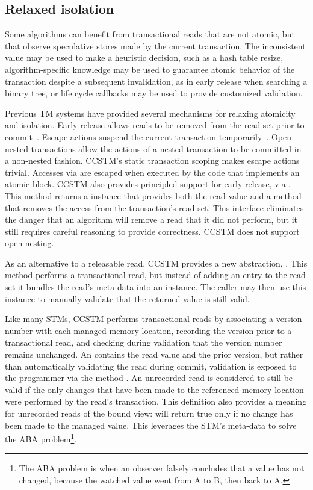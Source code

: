 
\subsection{Relaxed isolation}
\label{sec:unrecordedread}

Some algorithms can benefit from transactional reads that are not atomic,
but that observe speculative stores made by the current transaction.
The inconsistent value may be used to make a heuristic decision, such as a
hash table resize, algorithm-specific knowledge may be used to guarantee
atomic behavior of the transaction despite a subsequent invalidation,
as in early release when searching a binary tree, or life cycle callbacks
may be used to provide customized validation.

Previous TM systems have provided several mechanisms for relaxing
atomicity and isolation.  Early release allows reads to be removed
from the read set prior to commit~\cite{HerlihyLMS03}.  Escape actions
suspend the current transaction temporarily~\cite{harris04exceptions}.
Open nested transactions allow the actions of a nested transaction
to be committed in a non-nested fashion.  CCSTM's static transaction
scoping makes escape actions trivial.  Accesses via 
are escaped when executed by the code that implements an atomic
block. CCSTM also provides principled support for early release,
via .  This method returns a
 instance that provides both the read value and
a method that removes the access from the transaction's read set.
This interface eliminates the danger that an algorithm will remove a
read that it did not perform, but it still requires careful reasoning
to provide correctness.  CCSTM does not support open nesting.

As an alternative to a releasable read, CCSTM provides a new
abstraction, .  This method performs a
transactional read, but instead of adding an entry to the read set it
bundles the read's meta-data into an  instance.
The caller may then use this instance to manually validate that the
returned value is still valid.

Like many STMs, CCSTM performs transactional reads by associating a
version number with each managed memory location, recording the version
prior to a transactional read, and checking during validation that the
version number remains unchanged.  An  contains the
read value and the prior version, but rather than automatically validating
the read during commit, validation is exposed to the programmer via the
method .  An unrecorded read is considered to still be
valid if the only changes that have been made to the referenced memory
location were performed by the read's transaction.  This definition also
provides a meaning for unrecorded reads of the  bound view:
 will return true only if no change has been made to the
managed value.  This leverages the STM's meta-data to solve
the ABA problem\footnote{The ABA problem is when an observer falsely
concludes that a value has not changed, because the watched value went
from A to B, then back to A.}.

